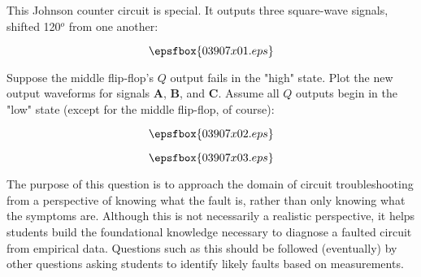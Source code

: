 

This Johnson counter circuit is special.  It outputs three square-wave signals, shifted 120$^{o}$ from one another:

$$\epsfbox{03907x01.eps}$$

Suppose the middle flip-flop's $Q$ output fails in the "high" state.  Plot the new output waveforms for signals {\bf A}, {\bf B}, and {\bf C}.  Assume all $Q$ outputs begin in the "low" state (except for the middle flip-flop, of course):

$$\epsfbox{03907x02.eps}$$







$$\epsfbox{03907x03.eps}$$







The purpose of this question is to approach the domain of circuit troubleshooting from a perspective of knowing what the fault is, rather than only knowing what the symptoms are.  Although this is not necessarily a realistic perspective, it helps students build the foundational knowledge necessary to diagnose a faulted circuit from empirical data.  Questions such as this should be followed (eventually) by other questions asking students to identify likely faults based on measurements.




